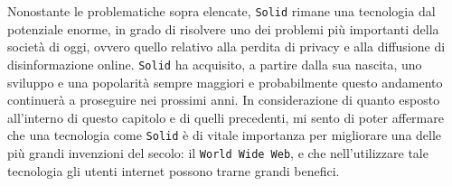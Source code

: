 \bigskip

Nonostante le problematiche sopra elencate, {\tt Solid} rimane una tecnologia dal potenziale enorme, in grado di risolvere uno dei problemi più importanti della società di oggi, ovvero quello relativo alla perdita di privacy e alla diffusione di disinformazione online. {\tt Solid} ha acquisito, a partire dalla sua nascita, uno sviluppo e una popolarità sempre maggiori e probabilmente questo andamento continuerà a proseguire nei prossimi anni. In considerazione di quanto esposto all'interno di questo capitolo e di quelli precedenti, mi sento di poter affermare che  una tecnologia come {\tt Solid} è di vitale importanza per migliorare una delle più grandi invenzioni del secolo: il {\tt World Wide Web}, e che nell'utilizzare tale tecnologia gli utenti internet possono trarne grandi benefici.



\clearpage